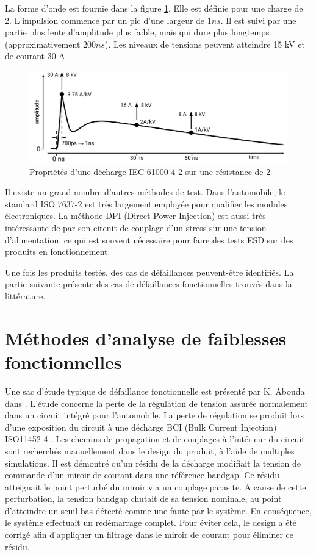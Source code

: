 La forme d'onde est fournie dans la figure \ref{iec_pulse}.
Elle est définie pour une charge de 2\textOmega{}.
L'impulsion commence par un pic d'une largeur de $1ns$.
Il est suivi par une partie plus lente d'amplitude plus faible, mais qui dure plus longtemps (approximativement $200ns$).
Les niveaux de tensions peuvent atteindre 15 kV et de courant 30 A.

\begin{figure}[!h]
  \centering
  \includegraphics[width=\textwidth]{src/1/figures/iec61000-4-2_waveform.pdf}
  \caption{Propriétés d'une décharge IEC 61000-4-2 sur une résistance de 2\textOmega{}}
  \label{iec_pulse}
\end{figure}

Il existe un grand nombre d'autres méthodes de test.
Dans l'automobile, le standard ISO 7637-2 est très largement employée pour qualifier les modules électroniques.
La méthode DPI (Direct Power Injection) est aussi très intéressante de par son circuit de couplage d'un stress sur une tension d'alimentation, ce qui est souvent nécessaire pour faire des tests ESD sur des produits en fonctionnement.

Une fois les produits testés, des cas de défaillances peuvent-être identifiés.
La partie suivante présente des cas de défaillances fonctionnelles trouvés dans la littérature.

\section{Méthodes d'analyse de faiblesses fonctionnelles}

Une sac d'étude typique de défaillance fonctionnelle est présenté par K. Abouda dans \cite{softfailEMCIC}.
L'étude concerne la perte de la régulation de tension assurée normalement dans un circuit intégré pour l'automobile.
La perte de régulation se produit lors d'une exposition du circuit à une décharge BCI (Bulk Current Injection) ISO11452-4 \cite{iso11452}.
Les chemins de propagation et de couplages à l'intérieur du circuit sont recherchés manuellement dans le design du produit, à l'aide de multiples simulations.
Il est démontré qu'un résidu de la décharge modifiait la tension de commande d'un miroir de courant dans une référence bandgap.
Ce résidu atteignait le point perturbé du miroir via un couplage parasite.
A cause de cette perturbation, la tension bandgap chutait de sa tension nominale, au point d'atteindre un seuil bas détecté comme une faute par le système.
En conséquence, le système effectuait un redémarrage complet.
Pour éviter cela, le design a été corrigé afin d'appliquer un filtrage dans le miroir de courant pour éliminer ce résidu.

